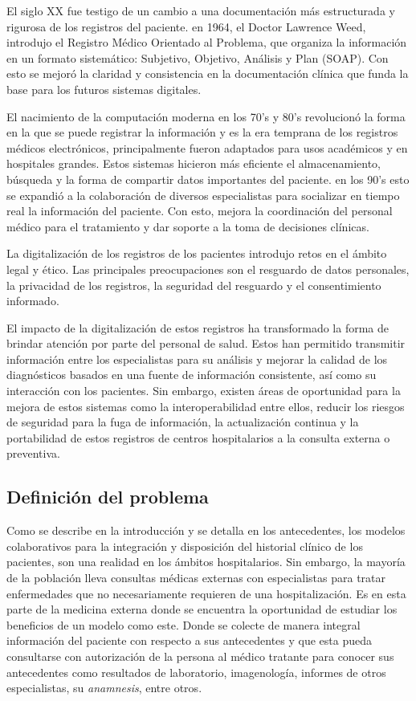     El siglo XX fue testigo de un cambio a una documentación más estructurada y rigurosa de los registros del paciente. en 1964, el Doctor Lawrence Weed, introdujo el Registro Médico Orientado al Problema, que organiza la información en un formato sistemático: Subjetivo, Objetivo, Análisis y Plan (SOAP). Con esto se mejoró la claridad y consistencia en la documentación clínica que funda la base para los futuros sistemas digitales.

    El nacimiento de la computación moderna en los 70's y 80's revolucionó la forma en la que se puede registrar la información y es la era temprana de los registros médicos electrónicos, principalmente fueron adaptados para usos académicos y en hospitales grandes. Estos sistemas hicieron más eficiente el almacenamiento, búsqueda y la forma de compartir datos importantes del paciente. en los 90's esto se expandió a la colaboración de diversos especialistas para socializar en tiempo real la información del paciente. Con esto, mejora la coordinación del personal médico para el tratamiento y dar soporte a la toma de decisiones clínicas.

    La digitalización de los registros de los pacientes introdujo retos en el ámbito legal y ético. Las principales preocupaciones son el resguardo de datos personales, la privacidad de los registros, la seguridad del resguardo y el consentimiento informado.

    El impacto de la digitalización de estos registros ha transformado la forma de brindar atención por parte del personal de salud. Estos han permitido transmitir información entre los especialistas para su análisis y mejorar la calidad de los diagnósticos basados en una fuente de información consistente, así como su interacción con los pacientes. Sin embargo, existen áreas de oportunidad para la mejora de estos sistemas como la interoperabilidad entre ellos, reducir los riesgos de seguridad para la fuga de información, la actualización continua y la portabilidad de estos registros de centros hospitalarios a la consulta externa o preventiva.
    \subsection{Definición del problema}
    Como se describe en la introducción y se detalla en los antecedentes, los modelos colaborativos para la integración y disposición del historial clínico de los pacientes, son una realidad en los ámbitos hospitalarios. Sin embargo, la mayoría de la población lleva consultas médicas externas con especialistas para tratar enfermedades que no necesariamente requieren de una hospitalización. Es en esta parte de la medicina externa donde se encuentra la oportunidad de estudiar los beneficios de un modelo como este. Donde se colecte de manera integral información del paciente con respecto a sus antecedentes y que esta pueda consultarse con autorización de la persona al médico tratante para conocer sus antecedentes como resultados de laboratorio, imagenología, informes de otros especialistas, su \emph{anamnesis}, entre otros.

